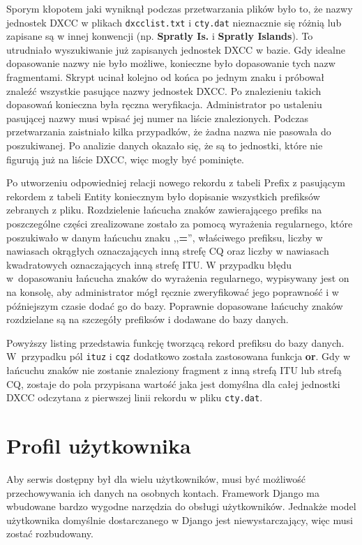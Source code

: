 \documentclass[]{mgr}
\begin{document}
            Sporym kłopotem jaki wyniknął podczas przetwarzania plików było to, że nazwy jednostek DXCC w plikach \texttt{dxcclist.txt} i \texttt{cty.dat} nieznacznie się różnią lub zapisane są w innej konwencji (np. \textbf{Spratly Is.} i \textbf{Spratly Islands}). To utrudniało wyszukiwanie już zapisanych jednostek DXCC w bazie. Gdy idealne dopasowanie nazwy nie było możliwe, konieczne było dopasowanie tych nazw fragmentami. Skrypt ucinał kolejno od końca po jednym znaku i próbował znaleźć wszystkie pasujące nazwy jednostek DXCC. Po znalezieniu takich dopasowań konieczna była ręczna weryfikacja. Administrator po ustaleniu pasującej nazwy musi wpisać jej numer na liście znalezionych. Podczas przetwarzania zaistniało kilka przypadków, że żadna nazwa nie pasowała do poszukiwanej. Po analizie danych okazało się, że są to jednostki, które nie figurują już na liście DXCC, więc mogły być pominięte.

            Po utworzeniu odpowiedniej relacji nowego rekordu z tabeli Prefix z pasującym rekordem z tabeli Entity koniecznym było dopisanie wszystkich prefiksów zebranych z pliku. Rozdzielenie łańcucha znaków zawierającego prefiks na poszczególne części zrealizowane zostało za pomocą wyrażenia regularnego, które poszukiwało w danym łańcuchu znaku ,,\textbf{=}'', właściwego prefiksu, liczby w nawiasach okrągłych oznaczających inną strefę CQ oraz liczby w nawiasach kwadratowych oznaczających inną strefę ITU. W przypadku błędu w~dopasowaniu łańcucha znaków do wyrażenia regularnego, wypisywany jest on na konsolę, aby administrator mógł ręcznie zweryfikować jego poprawność i w późniejszym czasie dodać go do bazy. Poprawnie dopasowane łańcuchy znaków rozdzielane są na szczegóły prefiksów i dodawane do bazy danych.  

            

            Powyższy listing przedstawia funkcję tworzącą rekord prefiksu do bazy danych. W~przypadku pól \texttt{ituz} i \texttt{cqz} dodatkowo została zastosowana funkcja \textbf{or}. Gdy w łańcuchu znaków nie zostanie znaleziony fragment z inną strefą ITU lub strefą CQ, zostaje do pola przypisana wartość jaka jest domyślna dla całej jednostki DXCC odczytana z pierwszej linii rekordu w pliku \texttt{cty.dat}.

        \section{Profil użytkownika}
        Aby serwis dostępny był dla wielu użytkowników, musi być możliwość przechowywania ich danych na osobnych kontach. Framework Django ma wbudowane bardzo wygodne narzędzia do obsługi użytkowników. Jednakże model użytkownika domyślnie dostarczanego w Django jest niewystarczający, więc musi zostać rozbudowany.
\end{document}
